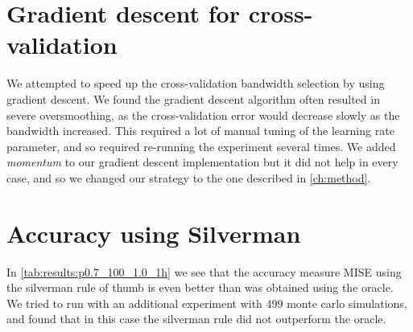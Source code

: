 \section{Gradient descent for cross-validation}
\label{sec:discussion:gradient_descent}

We attempted to speed up the cross-validation bandwidth selection by using gradient descent.
We found the gradient descent algorithm often resulted in severe oversmoothing,
as the cross-validation error would decrease slowly as the bandwidth increased.
This required a lot of manual tuning of the learning rate parameter, and so required re-running the experiment several times.
We added \textit{momentum} to our gradient descent implementation but it did not help in every case, and so we changed our strategy to the one described in \autoref{ch:method}.

\section{Accuracy using Silverman}

In \autoref{tab:results:p0.7_100_1.0_1h} we see that the accuracy measure MISE using the \gls{silverman} rule of thumb is even better than was obtained using the \gls{oracle}.
We tried to run with an additional experiment with 499 monte carlo simulations, and found that in this case the \gls{silverman} rule did not outperform the \gls{oracle}.

